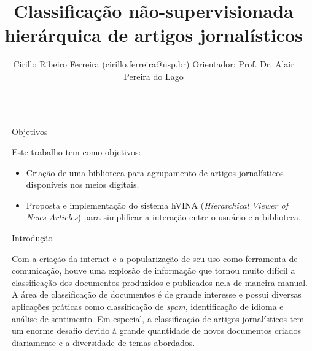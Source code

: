 \documentclass[final]{beamer}
\title{Classificação não-supervisionada hierárquica de artigos jornalísticos} %
\author{Cirillo Ribeiro Ferreira (cirillo.ferreira@usp.br) Orientador: Prof. Dr. Alair Pereira do Lago} %
\institute{Instituto de Matemática e Estatística, Universidade de São Paulo - Trabalho de Formatura Supervisionado} %
\newlength{\sepwid}
\newlength{\onecolwid}
\begin{document}

\setlength{\belowcaptionskip}{1ex} %
\setlength\belowdisplayshortskip{1ex} %

\begin{frame}[t] %

\begin{columns}[t] %

\begin{column}{\sepwid}\end{column} %

\begin{column}{\onecolwid} %


\begin{alertblock}{Objetivos}

Este trabalho tem como objetivos:
\begin{itemize}
\item Criação de uma biblioteca para agrupamento de artigos jornalísticos disponíveis nos meios digitais.
\item Proposta e implementação do sistema hVINA (\textit{Hierarchical Viewer of News Articles}) para simplificar a interação entre o usuário e a biblioteca.
\end{itemize}

\end{alertblock}


\begin{block}{Introdução}

Com a criação da internet e a popularização de seu uso como ferramenta de comunicação, houve uma explosão de informação que tornou muito difícil a classificação dos documentos produzidos e publicados nela de maneira manual. A área de classificação de documentos é de grande interesse e possui diversas aplicações práticas como classificação de \textit{spam}, identificação de idioma e análise de sentimento. Em especial, a classificação de artigos jornalísticos tem um enorme desafio devido à grande quantidade de novos documentos criados diariamente e a diversidade de temas abordados. %


\end{block}
\end{column}
\end{columns}
\end{frame}
\end{document}
